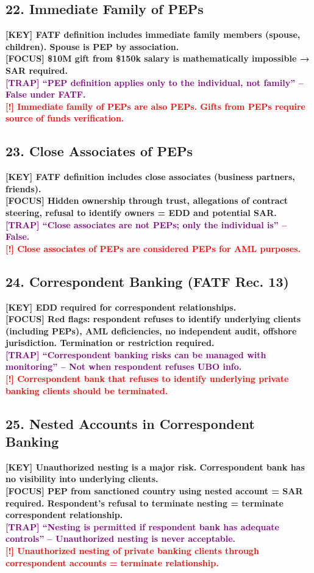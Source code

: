 \documentclass[10pt,a4paper]{article}
\newcommand{\redflag}[1]{\textcolor{red}{\textbf{[!] #1}}}
\newcommand{\examfocus}[1]{\textcolor{orange!80!black}{\textbf{[FOCUS] #1}}}
\newcommand{\trap}[1]{\textcolor{purple}{\textbf{[TRAP] #1}}}
\newcommand{\keyterm}[1]{\textcolor{red!80!black}{\textbf{[KEY] #1}}}
\begin{document}
\subsection*{22. Immediate Family of PEPs}
\keyterm{FATF definition includes immediate family members (spouse, children). Spouse is PEP by association.} \\
\examfocus{\$10M gift from \$150k salary is mathematically impossible → SAR required.} \\
\trap{“PEP definition applies only to the individual, not family” – False under FATF.} \\
\redflag{Immediate family of PEPs are also PEPs. Gifts from PEPs require source of funds verification.}

\subsection*{23. Close Associates of PEPs}
\keyterm{FATF definition includes close associates (business partners, friends).} \\
\examfocus{Hidden ownership through trust, allegations of contract steering, refusal to identify owners = EDD and potential SAR.} \\
\trap{“Close associates are not PEPs; only the individual is” – False.} \\
\redflag{Close associates of PEPs are considered PEPs for AML purposes.}

\subsection*{24. Correspondent Banking (FATF Rec. 13)}
\keyterm{EDD required for correspondent relationships.} \\
\examfocus{Red flags: respondent refuses to identify underlying clients (including PEPs), AML deficiencies, no independent audit, offshore jurisdiction. Termination or restriction required.} \\
\trap{“Correspondent banking risks can be managed with monitoring” – Not when respondent refuses UBO info.} \\
\redflag{Correspondent bank that refuses to identify underlying private banking clients should be terminated.}

\subsection*{25. Nested Accounts in Correspondent Banking}
\keyterm{Unauthorized nesting is a major risk. Correspondent bank has no visibility into underlying clients.} \\
\examfocus{PEP from sanctioned country using nested account = SAR required. Respondent’s refusal to terminate nesting = terminate correspondent relationship.} \\
\trap{“Nesting is permitted if respondent bank has adequate controls” – Unauthorized nesting is never acceptable.} \\
\redflag{Unauthorized nesting of private banking clients through correspondent accounts = terminate relationship.}
\end{document}
